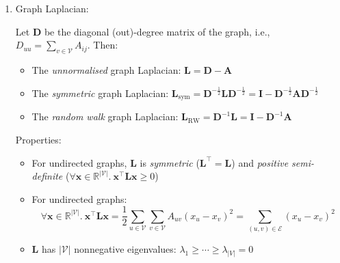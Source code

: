 \documentclass{article}
\begin{document}
\begin{enumerate}

	\item \vspace*{-0.5\baselineskip}Graph Laplacian:
	
	Let $\mathbf{D}$ be the diagonal (out)-degree matrix of the graph, i.e., $D_{uu}=\sum_{v\in\mathcal{V}}A_{ij}$. Then:
	\begin{itemize}[topsep=0pt]
		\item The \textit{unnormalised} graph Laplacian: $\mathbf{L}=\mathbf{D}-\mathbf{A}$
		\item The \textit{symmetric} graph Laplacian: $\mathbf{L}_\text{sym}=\mathbf{D}^{-\frac{1}{2}}\mathbf{L}\mathbf{D}^{-\frac{1}{2}}=\mathbf{I}-\mathbf{D}^{-\frac{1}{2}}\mathbf{A}\mathbf{D}^{-\frac{1}{2}}$
		\item The \textit{random walk} graph Laplacian: $\mathbf{L}_\text{RW}=\mathbf{D}^{-1}\mathbf{L}=\mathbf{I}-\mathbf{D}^{-1}\mathbf{A}$
	\end{itemize}
	
	Properties:
	\begin{itemize}[topsep=0pt]
		\item For undirected graphs, $\mathbf{L}$ is \textit{symmetric} ($\mathbf{L}^\top=\mathbf{L}$) and \textit{positive semi-definite} ($\forall\mathbf{x}\in\mathbb{R}^{|\mathcal{V}|}.\ \mathbf{x}^\top\mathbf{L}\mathbf{x}\geq0$)
		\item For undirected graphs:
		\vspace*{-0.5\baselineskip}
		$$\forall \mathbf{x}\in\mathbb{R}^{|\mathcal{V}|}.\ \mathbf{x}^\top\mathbf{L}\mathbf{x}=\frac{1}{2}\sum_{u\in\mathcal{V}}\sum_{v\in\mathcal{V}}A_{uv}(x_u-x_v)^2=\sum_{(u,v)\in\mathcal{E}}(x_u-x_v)^2$$
		\item \vspace*{-0.5\baselineskip}$\mathbf{L}$ has $|\mathcal{V}|$ nonnegative eigenvalues: $\lambda_1\geq\cdots\geq\lambda_{|V|}=0$
	\end{itemize}
	

\end{enumerate}
\end{document}
